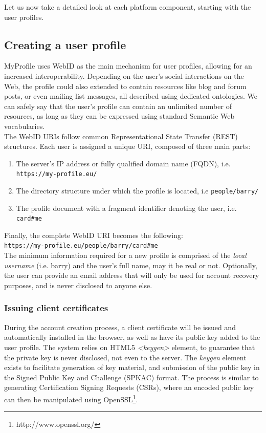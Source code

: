 Let us now take a detailed look at each platform component, starting with the user profiles.

\subsection{Creating a user profile}
MyProfile uses WebID as the main mechanism for user profiles, allowing for an increased interoperability. Depending on the user's social interactions on the Web, the profile could also extended to contain resources like blog and forum posts, or even mailing list messages, all described using dedicated ontologies. We can safely say that the user's profile can contain an unlimited number of resources, as long as they can be expressed using standard Semantic Web vocabularies.\\

The WebID URIs follow common Representational State Transfer (REST) structures. Each user is assigned a unique URI, composed of three main parts:
\begin{enumerate}
\item The server's IP address or fully qualified domain name (FQDN), i.e. \verb+https://my-profile.eu/+
\item The directory structure under which the profile is located, i.e \verb+people/barry/+ 
\item The profile document with a fragment identifier denoting the user, i.e. \verb+card#me+
\end{enumerate}

Finally, the complete WebID URI becomes the following:\\ 

\verb+https://my-profile.eu/people/barry/card#me+\\

The minimum information required for a new profile is comprised of the \textit{local username} (i.e. barry) and the user's full name, may it be real or not. Optionally, the user can provide an email address that will only be used for account recovery purposes, and is never disclosed to anyone else.

\subsubsection{Issuing client certificates}
During the account creation process, a client certificate will be issued and automatically installed in the browser, as well as have its public key added to the user profile. The system relies on HTML5 \textit{<keygen>} element, to guarantee that the private key is never disclosed, not even to the server. The \textit{keygen} element exists to facilitate generation of key material, and submission of the public key in the Signed Public Key and Challenge (SPKAC) \cite{ellison1999spki} format. The process is similar to generating Certification Signing Requests (CSRs), where an encoded public key can then be manipulated using OpenSSL\footnote{http://www.openssl.org/}.\\

